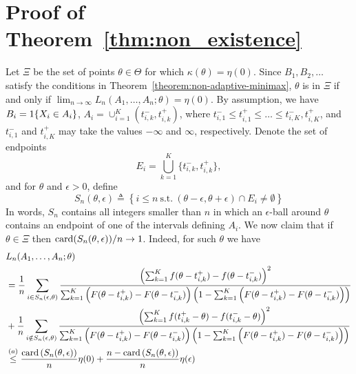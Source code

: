 
\section{Proof of Theorem~\ref{thm:non_existence}}
\label{proof:thm:non_existence}

Let $\Xi$ be the set of points $\theta \in \Theta$ for which $\kappa(\theta)
= \eta(0)$.
%
Since $B_1,B_2,\ldots$ satisfy the conditions in
Theorem~\ref{theorem:non-adaptive-minimax}, $\theta$ is in $\Xi$ if and only
if $\lim_{n\to \infty} L_n(A_1,\ldots,A_n;\theta) = \eta(0)$. By
assumption, we have $B_i = 1\!\left\{X_i \in A_i\right\}$, $A_i =
\cup_{i=1}^K (t^-_{i,k},t^+_{i,k})$, where $t^-_{i,1} \leq t^+_{i,1} \leq \ldots
\leq t^-_{i,K}, t^+_{i,K}$, and $t^-_{i,1}$ and $t^+_{i,K}$ may take the values
$-\infty$ and $\infty$, respectively. Denote the set of endpoints
\begin{equation*}
  E_i = \bigcup_{k=1}^{K}\{t^-_{i,k},t^+_{i,k}\},
\end{equation*}
and for $\theta$ and $\epsilon>0$, define
\begin{equation*}
  S_n(\theta, \epsilon) \triangleq \left\{ i\leq n ~ \mbox{s.t.}~
  (\theta-\epsilon,\theta+\epsilon) \cap E_i \neq \emptyset \right\}
\end{equation*}
In words, $S_n$ contains all integers smaller than $n$ in which an
$\epsilon$-ball around $\theta$ contains an endpoint of one of the intervals
defining $A_i$.
%
We now claim that 
if $\theta \in \Xi$ then $\mathrm{card}(S_n(\theta, \epsilon))/n \to 1$. Indeed, for such $\theta$ we have
\begin{align}
& L_n(A_1,\ldots,A_n; \theta) \nonumber \\
& = \frac{1}{n} \sum_{i \in S_n(\epsilon,\theta)}  
\frac{ \left(\sum_{k=1}^{K}  f(\theta - t^+_{i,k})- f(\theta - t^-_{i,k}) \right)^2}{ \sum_{k=1}^{K} \left( F(\theta - t^+_{i,k})- F(\theta - t^-_{i,k}) \right) \left(1-\sum_{k=1}^{K} \left( F(\theta - t^+_{i,k})- F(\theta - t^-_{i,k}) \right)\right)} \nonumber \\
& 
+ \frac{1}{n}\sum_{i \notin S_n(\epsilon,\theta) } \frac{ \left(\sum_{k=1}^{K}  f(t^+_{i,k}-\theta) - f(t^-_{i,k}-\theta) \right)^2} { \sum_{k=1}^{K} \left( F(\theta - t^+_{i,k})- F(\theta - t^-_{i,k}) \right) \left(1-\sum_{k=1}^{K} \left( F(\theta - t^+_{i,k})- F(\theta - t^-_{i,k}) \right)\right)} \nonumber \\
& \overset{(a)}{\leq}
\frac{\mathrm{card}\left(S_n(\theta,\epsilon)\right)}{n} \eta(0) + \frac{n-\mathrm{card}\left(S_n(\theta,\epsilon) \right) }{n} \eta(\epsilon) 
 \label{eq:non_existence_proof1}
\end{align}
